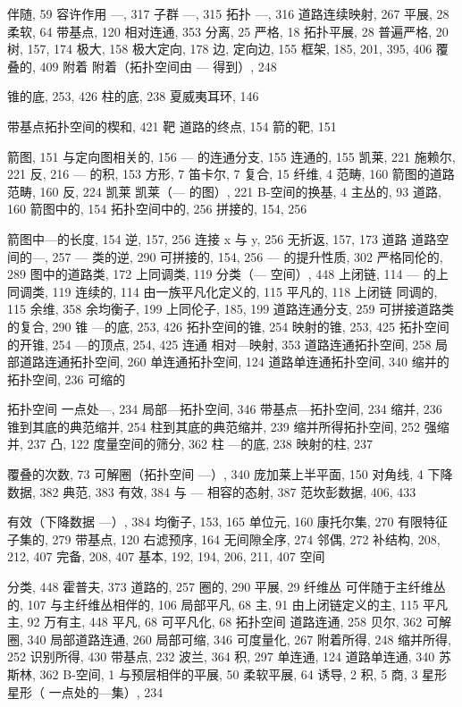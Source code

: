 

伴随, 59 容许作用 ---, 317 子群 ---, 315 拓扑 ---, 316 道路连续映射, 267 平展, 28 柔软, 64 带基点, 120 相对连通, 353 分离, 25 严格, 18 拓扑平展, 28 普遍严格, 20 树, 157, 174 极大, 158 极大定向, 178 边, 定向边, 155 框架, 185, 201, 395, 406 覆叠的, 409 附着 附着（拓扑空间由 --- 得到）, 248


锥的底, 253, 426 柱的底, 238 夏威夷耳环, 146

带基点拓扑空间的楔和, 421 靶 道路的终点, 154 箭的靶, 151


箭图, 151 与定向图相关的, 156 --- 的连通分支, 155 连通的, 155 凯莱, 221 施赖尔, 221 反, 216 --- 的积, 153 方形, 7 笛卡尔, 7 复合, 15 纤维, 4 范畴, 160 箭图的道路范畴, 160 反, 224 凯莱 凯莱（--- 的图）, 221 B-空间的换基, 4 主丛的, 93 道路, 160 箭图中的, 154 拓扑空间中的, 256 拼接的, 154, 256

箭图中---的长度, 154 逆, 157, 256 连接 x 与 y, 256 无折返, 157, 173 道路 道路空间的---, 257 --- 类的逆, 290 可拼接的, 154, 256 --- 的提升性质, 302 严格同伦的, 289 图中的道路类, 172 上同调类, 119 分类（--- 空间）, 448 上闭链, 114 --- 的上同调类, 119 连续的, 114 由一族平凡化定义的, 115 平凡的, 118 上闭链 同调的, 115 余维, 358 余均衡子, 199 上同伦子, 185, 199 道路连通分支, 259 可拼接道路类的复合, 290 锥 ---的底, 253, 426 拓扑空间的锥, 254 映射的锥, 253, 425 拓扑空间的开锥, 254 ---的顶点, 254, 425 连通 相对---映射, 353 道路连通拓扑空间, 258 局部道路连通拓扑空间, 260 单连通拓扑空间, 124 道路单连通拓扑空间, 340 缩并的 拓扑空间, 236 可缩的

拓扑空间 一点处---, 234 局部---拓扑空间, 346 带基点---拓扑空间, 234 缩并, 236 锥到其底的典范缩并, 254 柱到其底的典范缩并, 239 缩并所得拓扑空间, 252 强缩并, 237 凸, 122 度量空间的筛分, 362 柱 ---的底, 238 映射的柱, 237


覆叠的次数, 73 可解圈（拓扑空间 ---）, 340 庞加莱上半平面, 150 对角线, 4 下降数据, 382 典范, 383 有效, 384 与 --- 相容的态射, 387 范坎彭数据, 406, 433


有效（下降数据 ---）, 384 均衡子, 153, 165 单位元, 160 康托尔集, 270 有限特征子集的, 279 带基点, 120 右滤预序, 164 无间隙全序, 274 邻偶, 272 补结构, 208, 212, 407 完备, 208, 407 基本, 192, 194, 206, 211, 407 空间

分类, 448 霍普夫, 373 道路的, 257 圈的, 290 平展, 29 纤维丛 可伴随于主纤维丛的, 107 与主纤维丛相伴的, 106 局部平凡, 68 主, 91 由上闭链定义的主, 115 平凡主, 92 万有主, 448 平凡, 68 可平凡化, 68 拓扑空间 道路连通, 258 贝尔, 362 可解圈, 340 局部道路连通, 260 局部可缩, 346 可度量化, 267 附着所得, 248 缩并所得, 252 识别所得, 430 带基点, 232 波兰, 364 积, 297 单连通, 124 道路单连通, 340 苏斯林, 362 B-空间, 1 与预层相伴的平展, 50 柔软平展, 64 诱导, 2 积, 5 商, 3 星形 星形（ 一点处的---集）, 234

